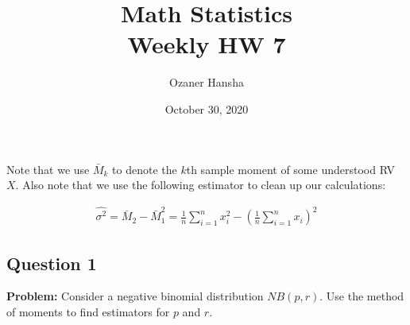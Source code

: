 \documentclass{article}
\begin{document}
\title{Math Statistics\\ Weekly HW 7}
\author{Ozaner Hansha}
\date{October 30, 2020}
\maketitle

Note that we use $\bar M_k$ to denote the $k$th sample moment of some understood RV $X$. Also note that we use the following estimator to clean up our calculations:

\begin{align*}
    \widehat{\sigma^2}=\bar M_2-\bar M_1^2=\frac{1}{n}\sum_{i=1}^nx_i^2-\left(\frac{1}{n}\sum_{i=1}^nx_i\right)^2\tag{i.e. the MLE sample variance}
\end{align*}

\subsection*{Question 1}
\noindent\textbf{Problem:} Consider a negative binomial distribution $NB(p,r)$. Use the method of moments to find estimators for $p$ and $r$.
\bigskip
\end{document}

